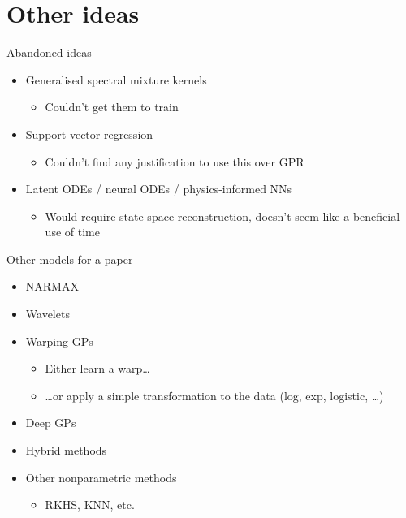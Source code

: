 \documentclass[presentation]{beamer}
\begin{document}
\section{Other ideas}
\label{sec:org30d9468}
\begin{frame}[label={sec:org9ab271b}]{Abandoned ideas}
\begin{itemize}
\item Generalised spectral mixture kernels
\begin{itemize}
\item Couldn't get them to train
\end{itemize}
\end{itemize}

\vfill
\begin{itemize}
\item Support vector regression
\begin{itemize}
\item Couldn't find any justification to use this over GPR
\end{itemize}
\end{itemize}

\vfill
\begin{itemize}
\item Latent ODEs / neural ODEs / physics-informed NNs
\begin{itemize}
\item Would require state-space reconstruction, doesn't seem like a beneficial use of time
\end{itemize}
\end{itemize}
\end{frame}


\begin{frame}[label={sec:org621f6a2}]{Other models for a paper}
\begin{itemize}
\item NARMAX
\item Wavelets
\item Warping GPs
\begin{itemize}
\item Either learn a warp\ldots{}
\item \ldots{}or apply a simple transformation to the data (log, exp, logistic, \ldots{})
\end{itemize}
\item Deep GPs
\item Hybrid methods
\item Other nonparametric methods
\begin{itemize}
\item RKHS, KNN, etc.
\end{itemize}
\end{itemize}
\end{frame}
\end{document}
